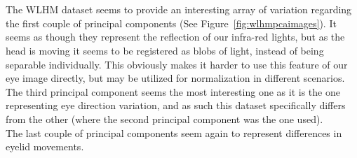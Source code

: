 \begin{minipage}{\linewidth}
{\begin{tabular}{ccccccc}
  \end{tabular}
  }
  \label{fig:wlhmpcaimages}
  \end{minipage}\\\\

  The WLHM dataset seems to provide an interesting array of variation regarding the first couple of principal components (See Figure~\ref{fig:wlhmpcaimages}).
  It seems as though they represent the reflection of our infra-red lights, but as the head is moving it seems to be registered as blobs of light, instead
  of being separable individually. This obviously makes it harder to use this feature of our eye image directly, but may be utilized for normalization in different scenarios.
  The third principal component seems the most interesting one as it is the one representing eye direction variation, and as such this dataset specifically differs
  from the other (where the second principal component was the one used).\\ The last couple of principal components seem again to represent differences in eyelid movements.\\

